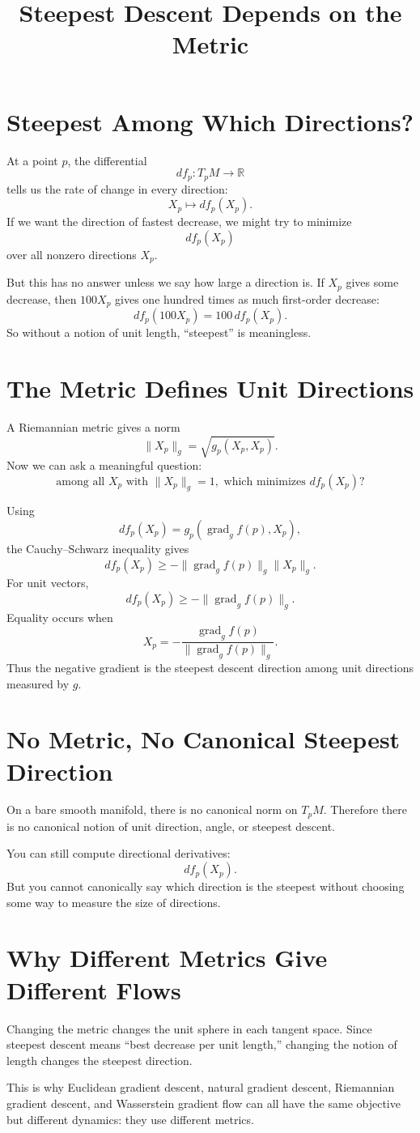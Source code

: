 \documentclass[11pt]{article}
\title{Steepest Descent Depends on the Metric}
\author{}
\date{}
\begin{document}
\maketitle

\section*{Steepest Among Which Directions?}

At a point $p$, the differential
\[
df_p:T_pM\to\mathbb R
\]
tells us the rate of change in every direction:
\[
X_p\mapsto df_p(X_p).
\]
If we want the direction of fastest decrease, we might try to minimize
\[
df_p(X_p)
\]
over all nonzero directions $X_p$.

But this has no answer unless we say how large a direction is. If $X_p$ gives
some decrease, then $100X_p$ gives one hundred times as much first-order
decrease:
\[
df_p(100X_p)=100\,df_p(X_p).
\]
So without a notion of unit length, ``steepest'' is meaningless.

\section*{The Metric Defines Unit Directions}

A Riemannian metric gives a norm
\[
\|X_p\|_g
=
\sqrt{g_p(X_p,X_p)}.
\]
Now we can ask a meaningful question:
\[
\text{among all }X_p\text{ with }\|X_p\|_g=1,
\text{ which minimizes }df_p(X_p)?
\]

Using
\[
df_p(X_p)
=
g_p(\operatorname{grad}_g f(p),X_p),
\]
the Cauchy--Schwarz inequality gives
\[
df_p(X_p)
\ge
-\|\operatorname{grad}_g f(p)\|_g\|X_p\|_g.
\]
For unit vectors,
\[
df_p(X_p)
\ge
-\|\operatorname{grad}_g f(p)\|_g.
\]
Equality occurs when
\[
X_p
=
-\frac{\operatorname{grad}_g f(p)}
{\|\operatorname{grad}_g f(p)\|_g}.
\]
Thus the negative gradient is the steepest descent direction among unit
directions measured by $g$.

\section*{No Metric, No Canonical Steepest Direction}

On a bare smooth manifold, there is no canonical norm on $T_pM$. Therefore
there is no canonical notion of unit direction, angle, or steepest descent.

You can still compute directional derivatives:
\[
df_p(X_p).
\]
But you cannot canonically say which direction is the steepest without choosing
some way to measure the size of directions.

\section*{Why Different Metrics Give Different Flows}

Changing the metric changes the unit sphere in each tangent space. Since
steepest descent means ``best decrease per unit length,'' changing the notion
of length changes the steepest direction.

This is why Euclidean gradient descent, natural gradient descent, Riemannian
gradient descent, and Wasserstein gradient flow can all have the same objective
but different dynamics: they use different metrics.
\end{document}
